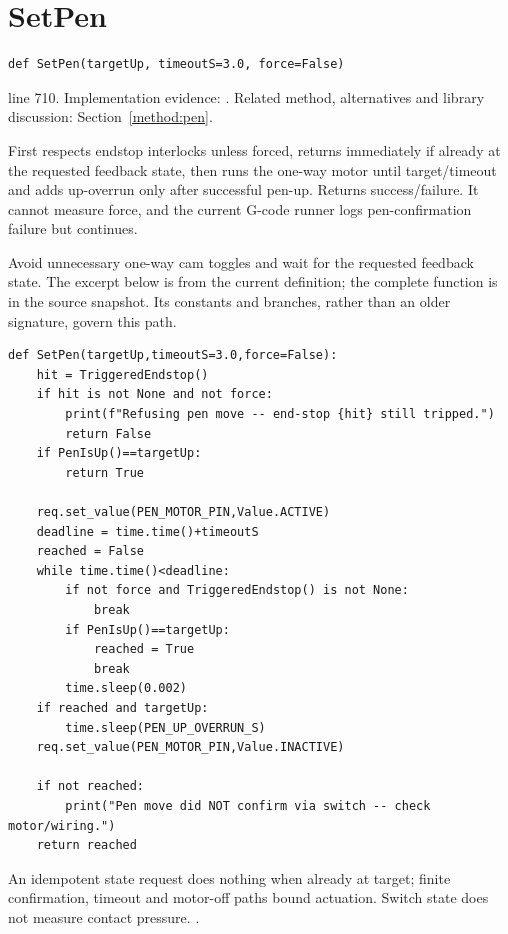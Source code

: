 \section{SetPen}\label{fn:reproduce:SetPen}
\begin{lstlisting}[style=sig]
def SetPen(targetUp, timeoutS=3.0, force=False)
\end{lstlisting}
 line 710. Implementation evidence: \cite{code2026}. Related method, alternatives and library discussion: Section~\ref{method:pen}.


First respects endstop interlocks unless forced, returns immediately if already at the requested feedback state, then runs the one-way motor until target/timeout and adds up-overrun only after successful pen-up. Returns success/failure. It cannot measure force, and the current G-code runner logs pen-confirmation failure but continues.


Avoid unnecessary one-way cam toggles and wait for the requested feedback state. The excerpt below is from the current definition; the complete function is in the source snapshot. Its constants and branches, rather than an older signature, govern this path.


\begin{lstlisting}[style=plain]
def SetPen(targetUp,timeoutS=3.0,force=False):
    hit = TriggeredEndstop()
    if hit is not None and not force:
        print(f"Refusing pen move -- end-stop {hit} still tripped.")
        return False
    if PenIsUp()==targetUp:
        return True

    req.set_value(PEN_MOTOR_PIN,Value.ACTIVE)
    deadline = time.time()+timeoutS
    reached = False
    while time.time()<deadline:
        if not force and TriggeredEndstop() is not None:
            break
        if PenIsUp()==targetUp:
            reached = True
            break
        time.sleep(0.002)
    if reached and targetUp:
        time.sleep(PEN_UP_OVERRUN_S)
    req.set_value(PEN_MOTOR_PIN,Value.INACTIVE)

    if not reached:
        print("Pen move did NOT confirm via switch -- check motor/wiring.")
    return reached
\end{lstlisting}
An idempotent state request does nothing when already at target; finite confirmation, timeout and motor-off paths bound actuation. Switch state does not measure contact pressure. \cite{kernelgpio,rohmnpn,code2026}.


